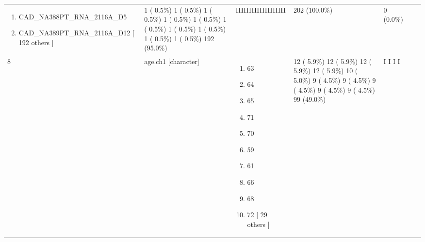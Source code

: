 \documentclass[
]{article}
\providecommand{\tightlist}{%
  \setlength{\itemsep}{0pt}\setlength{\parskip}{0pt}}
\begin{document}
\begin{longtable}[]{@{}lllllll@{}}
\begin{minipage}[t]{0.20\columnwidth}
\begin{enumerate}
\item
  CAD\_NA388PT\_RNA\_2116A\_D5
\item
  CAD\_NA389PT\_RNA\_2116A\_D12
  {[} 192 others {]}
\end{enumerate}\strut
\end{minipage} & \begin{minipage}[t]{0.14\columnwidth}\raggedright
1 ( 0.5\%)
1 ( 0.5\%)
1 ( 0.5\%)
1 ( 0.5\%)
1 ( 0.5\%)
1 ( 0.5\%)
1 ( 0.5\%)
1 ( 0.5\%)
1 ( 0.5\%)
1 ( 0.5\%)
192 (95.0\%)\strut
\end{minipage} & \begin{minipage}[t]{0.14\columnwidth}\raggedright
IIIIIIIIIIIIIIIIIII\strut
\end{minipage} & \begin{minipage}[t]{0.07\columnwidth}\raggedright
202
(100.0\%)\strut
\end{minipage} & \begin{minipage}[t]{0.07\columnwidth}\raggedright
0
(0.0\%)\strut
\end{minipage}\tabularnewline
\begin{minipage}[t]{0.03\columnwidth}\raggedright
8\strut
\end{minipage} & \begin{minipage}[t]{0.16\columnwidth}\raggedright
age.ch1
{[}character{]}\strut
\end{minipage} & \begin{minipage}[t]{0.20\columnwidth}\raggedright
\begin{enumerate}
\def\labelenumi{\arabic{enumi}.}
\tightlist
\item
  63
\item
  64
\item
  65
\item
  71
\item
  70
\item
  59
\item
  61
\item
  66
\item
  68
\item
  72
  {[} 29 others {]}
\end{enumerate}\strut
\end{minipage} & \begin{minipage}[t]{0.14\columnwidth}\raggedright
12 ( 5.9\%)
12 ( 5.9\%)
12 ( 5.9\%)
12 ( 5.9\%)
10 ( 5.0\%)
9 ( 4.5\%)
9 ( 4.5\%)
9 ( 4.5\%)
9 ( 4.5\%)
9 ( 4.5\%)
99 (49.0\%)\strut
\end{minipage} & \begin{minipage}[t]{0.14\columnwidth}\raggedright
I
I
I
I


\end{minipage}
\end{longtable}
\end{document}
